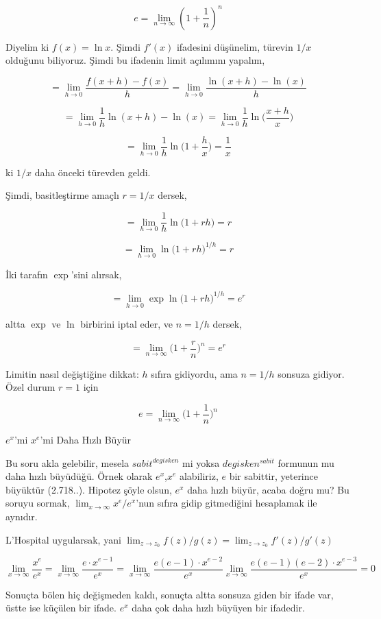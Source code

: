 \documentclass[12pt,fleqn]{article}\usepackage{../../common}
\begin{document}
$$ e = \lim_{n \to \infty} (1+ \frac{1}{n})^n $$

Diyelim ki $f(x)=\ln x$. Şimdi $f'(x)$ ifadesini düşünelim, türevin $1/x$
olduğunu biliyoruz. Şimdi bu ifadenin limit açılımını yapalım,

$$
= \lim_{h \to 0} \frac{f(x+h)-f(x)}{h}
= \lim_{h \to 0} \frac{\ln(x+h)-\ln(x)}{h} 
$$

$$
= \lim_{h \to 0} \frac{1}{h} \ln(x+h)-\ln(x)
= \lim_{h \to 0} \frac{1}{h} \ln \big(\frac{x+h}{x} \big)
$$

$$ = \lim_{h \to 0} \frac{1}{h} \ln \big( 1 + \frac{h}{x} \big) = \frac{1}{x}  $$

ki $1/x$ daha önceki türevden geldi. 

Şimdi, basitleştirme amaçlı $r=1/x$ dersek,

$$ = \lim_{h \to 0} \frac{1}{h} \ln \big( 1 + rh \big) = r  $$

$$ = \lim_{h \to 0}  \ln \big( 1 + rh \big)^{1/h} = r  $$

İki tarafın $\exp$'sini alırsak, 

$$ = \lim_{h \to 0}  \exp \ln \big( 1 + rh \big)^{1/h} = e^r  $$

altta $\exp$ ve $\ln$ birbirini iptal eder, ve $n = 1/h$ dersek,

$$ = \lim_{n \to \infty}  \big( 1 + \frac{r}{n} \big)^{n} = e^r  $$

Limitin nasıl değiştiğine dikkat: $h$ sıfıra gidiyordu, ama $n=1/h$ sonsuza
gidiyor. Özel durum $r=1$ için  

$$ e = \lim_{n \to \infty}  \big( 1 + \frac{1}{n} \big)^{n}$$

$e^x$'mi $x^e$'mi Daha Hızlı Büyür

Bu soru akla gelebilir, mesela $sabit^{degisken}$ mi yoksa
$degisken^{sabit}$ formunun mu daha hızlı büyüdüğü. Örnek olarak
$e^{x}$,$x^e$ alabiliriz, $e$ bir sabittir, yeterince büyüktür
(2.718..). Hipotez şöyle olsun, $e^{x}$ daha hızlı büyür, acaba doğru mu?
Bu soruyu sormak, $\lim_{x \to \infty} x^e / e^{x}$'nun sıfıra gidip
gitmediğini hesaplamak ile aynıdır. 

L'Hospital uygularsak, yani $\lim_{z \to z_0} f(z)/g(z) = \lim_{z \to z_0} f'(z)/g'(z)$

$$ 
\lim_{x \to \infty} \frac{x^e}{e^{x}} = 
\lim_{x \to \infty} \frac{e \cdot x^{e-1}}{e^{x}} = 
\lim_{x \to \infty} \frac{e(e-1) \cdot x^{e-2}}{e^{x}} 
\lim_{x \to \infty} \frac{e(e-1)(e-2) \cdot x^{e-3}}{e^{x}} = 0
$$

Sonuçta bölen hiç değişmeden kaldı, sonuçta altta sonsuza giden bir ifade
var, üstte ise küçülen bir ifade. $e^x$ daha çok daha hızlı büyüyen bir
ifadedir.
\end{document}

